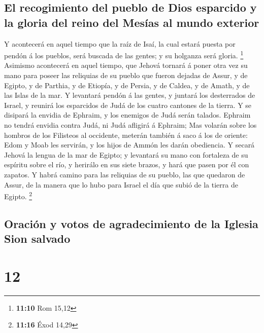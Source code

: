 \hypertarget{el-recogimiento-del-pueblo-de-dios-esparcido-y-la-gloria-del-reino-del-mesuxedas-al-mundo-exterior}{%
\subsection{El recogimiento del pueblo de Dios esparcido y la gloria del
reino del Mesías al mundo
exterior}\label{el-recogimiento-del-pueblo-de-dios-esparcido-y-la-gloria-del-reino-del-mesuxedas-al-mundo-exterior}}

 Y acontecerá en aquel tiempo que la raíz de Isaí, la cual
estará puesta por pendón á los pueblos, será buscada de las gentes; y su
holganza será gloria. \footnote{\textbf{11:10} Rom 15,12} 
Asimismo acontecerá en aquel tiempo, que Jehová tornará á poner otra vez
su mano para poseer las reliquias de su pueblo que fueron dejadas de
Assur, y de Egipto, y de Parthia, y de Etiopía, y de Persia, y de
Caldea, y de Amath, y de las Islas de la mar.  Y levantará
pendón á las gentes, y juntará los desterrados de Israel, y reunirá los
esparcidos de Judá de los cuatro cantones de la tierra.  Y
se disipará la envidia de Ephraim, y los enemigos de Judá serán talados.
Ephraim no tendrá envidia contra Judá, ni Judá afligirá á Ephraim;
 Mas volarán sobre los hombros de los Filisteos al
occidente, meterán también á saco á los de oriente: Edom y Moab les
servirán, y los hijos de Ammón les darán obediencia.  Y
secará Jehová la lengua de la mar de Egipto; y levantará su mano con
fortaleza de su espíritu sobre el río, y herirálo en sus siete brazos, y
hará que pasen por él con zapatos.  Y habrá camino para las
reliquias de su pueblo, las que quedaron de Assur, de la manera que lo
hubo para Israel el día que subió de la tierra de Egipto. \footnote{\textbf{11:16}
  Éxod 14,29}

\hypertarget{oraciuxf3n-y-votos-de-agradecimiento-de-la-iglesia-sion-salvado}{%
\subsection{Oración y votos de agradecimiento de la Iglesia Sion
salvado}\label{oraciuxf3n-y-votos-de-agradecimiento-de-la-iglesia-sion-salvado}}

\hypertarget{section-11}{%
\section{12}\label{section-11}}

